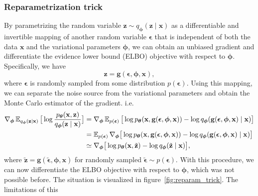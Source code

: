\subsubsection{Reparametrization trick}
By parametrizing the random variable $\mathbf{z} \sim q_{\boldsymbol{\phi}}(\mathbf{z}\mid \mathbf{x})$ as a differentiable and invertible mapping of another random variable $\boldsymbol{\epsilon}$ that is independent
of both the data $\mathbf{x}$ and the variational parameters ${\boldsymbol{\phi}}$, we can obtain an unbiased gradient and differentiate the evidence lower bound (ELBO) objective with respect to ${\boldsymbol{\phi}}$. 
Specifically, we have 
\begin{equation*}
    \mathbf{z} = \mathbf{g}(\boldsymbol{\epsilon},{\boldsymbol{\phi}},\mathbf{x}),
\end{equation*}
where $\boldsymbol{\epsilon}$ is randomly sampled from some distribution $p(\boldsymbol{\epsilon})$. Using this mapping, we can separate the noise source from the variational parameters and 
obtain the Monte Carlo estimator of the gradient. i.e.
\begin{align*}
    \nabla_{{\boldsymbol{\phi}}} \operatorname{\mathbb{E}}_{q_{\boldsymbol{\phi}}(\mathbf{z}\mid \mathbf{x})} \big[\log \frac{p_{\boldsymbol{\theta}}(\mathbf{x},\mathbf{z})}{q_{\boldsymbol{\phi}}(\mathbf{z}\mid \mathbf{x})}\big] 
    &= \nabla_{{\boldsymbol{\phi}}} \operatorname{\mathbb{E}}_{p(\boldsymbol{\epsilon})} \big[\log p_{\boldsymbol{\theta}}(\mathbf{x},\mathbf{g}(\boldsymbol{\epsilon},{\boldsymbol{\phi}},\mathbf{x})) - \log q_{\boldsymbol{\phi}}(\mathbf{g}(\boldsymbol{\epsilon},{\boldsymbol{\phi}},\mathbf{x})\mid \mathbf{x})\big]\\
    &=  \operatorname{\mathbb{E}}_{p(\boldsymbol{\epsilon})} \nabla_{{\boldsymbol{\phi}}} \big[\log p_{\boldsymbol{\theta}}(\mathbf{x},\mathbf{g}(\boldsymbol{\epsilon},{\boldsymbol{\phi}},\mathbf{x})) - \log q_{\boldsymbol{\phi}}(\mathbf{g}(\boldsymbol{\epsilon},{\boldsymbol{\phi}},\mathbf{x})\mid \mathbf{x})\big] \\
    &\simeq \nabla_{{\boldsymbol{\phi}}} \big[\log p_{\boldsymbol{\theta}}(\mathbf{x},\tilde{\mathbf{z}}) - \log q_{\boldsymbol{\phi}}(\tilde{\mathbf{z}}\mid \mathbf{x})\big],
\end{align*}
where $\tilde{\mathbf{z}} = \mathbf{g}(\tilde{\boldsymbol{\epsilon}},{\boldsymbol{\phi}},\mathbf{x})$  for randomly sampled 
$\tilde{\boldsymbol{\epsilon}} \sim p(\boldsymbol{\epsilon})$. With this procedure, we can now differentiate the ELBO objective with respect to
${\boldsymbol{\phi}}$, which was not possible before. The situation is visualized in figure~\ref{fig:reparam_trick}. The limitations of this 
